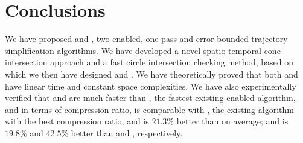 \section{Conclusions} %

We have proposed \cist and \cista, two \sed enabled, one-pass and error bounded trajectory simplification algorithms.
%
We have developed a novel spatio-temporal cone intersection approach and a fast circle intersection checking method, based on which we then have designed \cist and \cista.
%
We have theoretically proved that both \cist and \cista have linear time and constant space complexities.
%
We have also experimentally verified that \cist and \cista are much faster than \squishe, the fastest existing \sed enabled \lsa algorithm,
and in terms of compression ratio, \cist is \textcolor[rgb]{1.00,0.00,0.00}{comparable} with \dpa, the existing \lsa algorithm with the best compression ratio, and is $21.3\%$ better than \squishe on average; and \cista is {$19.8\%$} and {$42.5\%$} better than \dps and \squishe, respectively.
